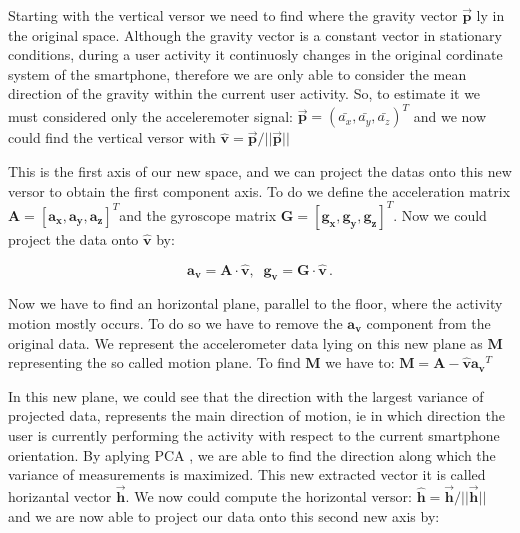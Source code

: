 Starting with the vertical versor we need to find where the gravity vector $\boldsymbol{\vec{p}}$ ly in the original space. Although the gravity vector is a constant vector in stationary conditions, during a user activity it continuosly changes in the original cordinate system of the smartphone, therefore we are only able to consider the mean direction of the gravity within the current user activity. So, to estimate it we must considered only the acceleremoter signal: \mbox{$ \boldsymbol{\vec{p}} = (\bar{a_{x}}, \bar{a_{y}}, \bar{a_{z}})^{T}$}  and we now could find the vertical versor with \mbox{$ \boldsymbol{\hat{v}} = \boldsymbol{\vec{p}} / ||\boldsymbol{\vec{p}}|| $}

This is the first axis of our new space, and we can project the datas onto this new versor to obtain the first component axis. To do we define the acceleration matrix \mbox{$\boldsymbol{A} = [ \boldsymbol{a_{x}}, \boldsymbol{a_{y}}, \boldsymbol{a_{z}} ]^{T}$}and the gyroscope matrix \mbox{$\boldsymbol{G} = [ \boldsymbol{g_{x}}, \boldsymbol{g_{y}}, \boldsymbol{g_{z}} ]^{T} $}. Now we could project the data onto $\boldsymbol{\hat{v}}$ by:

\begin{equation}
	\label{v-axis eq}
	 \boldsymbol{a_{v}} = \boldsymbol{A} \cdot \boldsymbol{\hat{v}} ,\;\; \boldsymbol{g_{v}} = \boldsymbol{G} \cdot \boldsymbol{\hat{v}} \,.
\end{equation}

Now we have to find an horizontal plane, parallel to the floor, where the activity motion mostly occurs. To do so we have to remove the  $\boldsymbol{a_{v}}$ component from the original data. We represent the accelerometer data lying on this new plane as $\boldsymbol{M}$ representing the so called motion plane. To find $\boldsymbol{M}$ we have to: \mbox{$\boldsymbol{M} = \boldsymbol{A} - \boldsymbol{\hat{v}} \boldsymbol{a_{v}}^{T} $}

In this new plane, we could see that the direction with the largest variance of projected data, represents the main direction of motion, ie in which direction the user is currently performing the activity with respect to the current smartphone orientation. By aplying PCA \cite{rao1964use}, we are able to find the direction along which the variance of measurements is maximized. This new extracted vector it is called horizantal vector $\boldsymbol{\vec{h}}$. We now could compute the horizontal versor: \mbox{$ \boldsymbol{\hat{h}} = \boldsymbol{\vec{h}} / ||\boldsymbol{\vec{h}}|| $} and we are now able to project our data onto this second new axis by:

